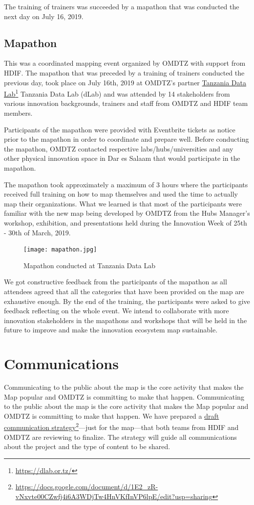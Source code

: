 \documentclass[a4paper,12pt,twoside]{article}
\begin{document}
The training of trainers was succeeded by a mapathon that was conducted the next day on July 16, 2019.

\subsection{Mapathon}
This was a coordinated mapping event organized by OMDTZ with support from HDIF. The mapathon that was preceded by a training of trainers conducted the previous day, took place on July 16th, 2019 at OMDTZ’s partner \href{https://dlab.or.tz/}{Tanzania Data Lab}\footnote{\url{https://dlab.or.tz/}} Tanzania Data Lab (dLab) and was attended by 14 stakeholders from various innovation backgrounds, trainers and staff from OMDTZ and HDIF team members.

Participants of the mapathon were provided with Eventbrite tickets as notice prior to the mapathon in order to coordinate and prepare well. Before conducting the mapathon, OMDTZ contacted respective labs/hubs/universities and any other physical innovation space in Dar es Salaam that would participate in the mapathon.

The mapathon took approximately a maximum of 3 hours where the participants received full training on how to map themselves and used the time to actually map their organizations. What we learned is that most of the participants were familiar with the new map being developed by OMDTZ from the Hubs Manager’s workshop, exhibition, and presentations held during the Innovation Week of 25th - 30th of March, 2019.  

\begin{figure}%
	\centering
	\caption{Mapathon conducted at Tanzania Data Lab}
	\texttt{[image: mapathon.jpg]}
\end{figure}

We got constructive feedback from the participants of the mapathon as all attendees agreed that all the categories that have been provided on the map are exhaustive enough. By the end of the training, the participants were asked to give feedback reflecting on the whole event. We intend to collaborate with more innovation stakeholders in the mapathons and workshops that will be held in the future to improve and make the innovation ecosystem map sustainable.

\section{Communications}
Communicating to the public about the map is the core activity that makes the Map popular and OMDTZ is committing to make that happen. Communicating to the public about the map is the core activity that makes the Map popular and OMDTZ is committing to make that happen. We have prepared a \href{https://docs.google.com/document/d/1E2_zR-vNxvte00CZwfj4i6A3WDjTw4HnVKfInVP6lpE/edit?usp=sharing}{draft communication strategy}\footnote{\url{https://docs.google.com/document/d/1E2_zR-vNxvte00CZwfj4i6A3WDjTw4HnVKfInVP6lpE/edit?usp=sharing}}---just for the map---that both teams from HDIF and OMDTZ are reviewing to finalize. The strategy will guide all communications about the project and the type of content to be shared.
\end{document}
